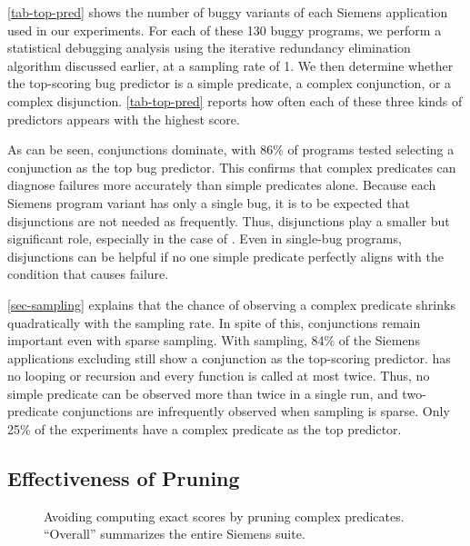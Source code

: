 \autoref{tab-top-pred} shows the number of buggy variants of each Siemens application used in our experiments.  For each of these 130 buggy programs, we perform a statistical debugging analysis using the iterative redundancy elimination algorithm discussed earlier, at a sampling rate of 1.  We then determine whether the top-scoring bug predictor is a simple predicate, a complex conjunction, or a complex disjunction.  \autoref{tab-top-pred} reports how often each of these three kinds of predictors appears with the highest score.

As can be seen, conjunctions dominate, with 86\% of programs tested selecting a conjunction as the top bug predictor.  This confirms that complex predicates can diagnose failures more accurately than simple predicates alone.  Because each Siemens program variant has only a single bug, it is to be expected that disjunctions are not needed as frequently.  Thus, disjunctions play a smaller but significant role, especially in the case of .  Even in single-bug programs, disjunctions can be helpful if no one simple predicate perfectly aligns with the condition that causes failure.

\autoref{sec-sampling} explains that the chance of observing a complex predicate shrinks quadratically with the sampling rate.  In spite of this, conjunctions remain important even with sparse sampling.  With  sampling, 84\% of the Siemens applications excluding  still show a conjunction as the top-scoring predictor.   has no looping or recursion and every function is called at most twice.  Thus, no simple predicate can be observed more than twice in a single  run, and two-predicate conjunctions are infrequently observed when sampling is sparse.  Only 25\% of the  experiments have a complex predicate as the top predictor.

\subsection{Effectiveness of Pruning}
\label{sec-effectprune}

\begin{figure*}[tb]
  \centering
  \hfill
  \caption{Avoiding computing exact scores by pruning complex predicates.  ``Overall'' summarizes the entire Siemens suite.}
  \label{fig-pruning}
\end{figure*}

